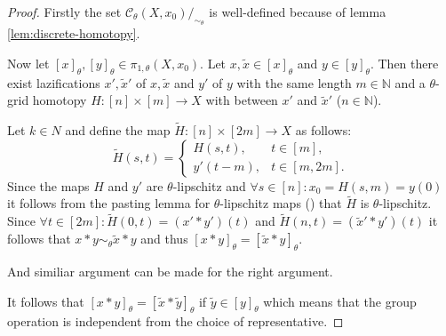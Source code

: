 \documentclass[a4paper, 11pt, twoside]{article}
\newcommand{\N}[0]{\mathbb{N}}
\theoremstyle{break}
\theoremstyle{break}
\begin{document}
\begin{proof}
  Firstly the set $\mathcal{C}_{\theta}(X, x_0)/_{\sim_{\theta}}$ is well-defined because of lemma \ref{lem:discrete-homotopy}.

  Now let $[x]_{\theta}, [y]_{\theta} \in \pi_{1, \theta}(X, x_0)$. Let $x, \tilde{x} \in [x]_{\theta}$ and $y \in [y]_{\theta}$.
  Then there exist lazifications $x', \tilde{x}'$ of $x, \tilde{x}$ and $y'$ of $y$ with the same length $m \in \N$ 
  and a $\theta$-grid homotopy $H: [n] \times [m] \to X$ with  between $x'$ and $\tilde{x}'$ ($n \in \N$).

  Let $k \in N$ and define the map $\tilde{H}: [n] \times [2m] \to X$ as follows:
  \begin{equation*}
    \tilde{H}(s, t) = \begin{cases}
       H(s, t), &t \in [m], \\
       y'(t-m), &t \in [m,2m].
    \end{cases}
  \end{equation*}
  Since the maps $H$ and $y'$ are $\theta$-lipschitz and $\forall s \in [n]: x_0 = H(s,m) = y(0)$ 
  it follows from the pasting lemma for $\theta$-lipschitz maps (\cite[Thm. 1]{kvalheim2021pasting}) that $\tilde{H}$ is $\theta$-lipschitz.
  Since $\forall t \in [2m]: \tilde{H}(0, t) = (x' * y')(t)$ and $\tilde{H}(n, t) = (\tilde{x}' * y')(t)$ it follows that $x * y \sim_{\theta} \tilde{x} * y$ and thus $[x * y]_{\theta} = [\tilde{x} * y]_\theta$.

  And similiar argument can be made for the right argument. 
  
  It follows that $[x * y]_{\theta} = [\tilde{x} * \tilde{y}]_{\theta}$ if $\tilde{y} \in [y]_\theta$ 
  which means that the group operation is independent from the choice of representative.


\end{proof}
\end{document}
